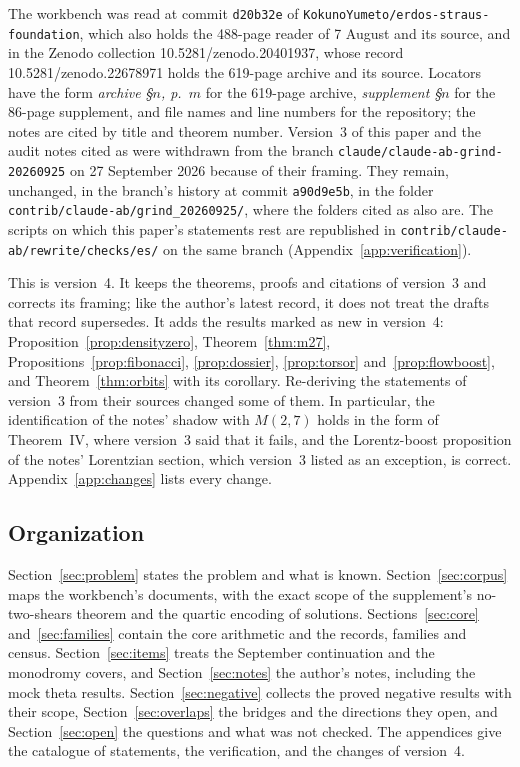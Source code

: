 The workbench was read at commit \texttt{d20b32e} of \texttt{KokunoYumeto/erdos-straus-foundation}, which also holds the 488-page reader of 7 August and its source, and in the Zenodo collection 10.5281/zenodo.20401937, whose record 10.5281/zenodo.22678971 holds the 619-page archive and its source. Locators have the form \emph{archive §$n$, p.~$m$} for the 619-page archive, \emph{supplement §$n$} for the 86-page supplement, and file names and line numbers for the repository; the notes are cited by title and theorem number. Version~3 of this paper and the audit notes cited as  were withdrawn from the branch \texttt{claude/claude-ab-grind-20260925} on 27 September 2026 because of their framing. They remain, unchanged, in the branch's history at commit \texttt{a90d9e5b}, in the folder \texttt{contrib/claude-ab/grind\_20260925/}, where the folders cited as  also are. The scripts on which this paper's statements rest are republished in \texttt{contrib/claude-ab/rewrite/checks/es/} on the same branch (Appendix~\ref{app:verification}).

This is version~4. It keeps the theorems, proofs and citations of version~3 and corrects its framing; like the author's latest record, it does not treat the drafts that record supersedes. It adds the results marked as new in version~4: Proposition~\ref{prop:densityzero}, Theorem~\ref{thm:m27}, Propositions~\ref{prop:fibonacci}, \ref{prop:dossier}, \ref{prop:torsor} and~\ref{prop:flowboost}, and Theorem~\ref{thm:orbits} with its corollary. Re-deriving the statements of version~3 from their sources changed some of them. In particular, the identification of the notes' shadow with $M(2,7)$ holds in the form of Theorem~IV, where version~3 said that it fails, and the Lorentz-boost proposition of the notes' Lorentzian section, which version~3 listed as an exception, is correct. Appendix~\ref{app:changes} lists every change.

\subsection*{Organization}

Section~\ref{sec:problem} states the problem and what is known. Section~\ref{sec:corpus} maps the workbench's documents, with the exact scope of the supplement's no-two-shears theorem and the quartic encoding of solutions. Sections~\ref{sec:core} and~\ref{sec:families} contain the core arithmetic and the records, families and census. Section~\ref{sec:items} treats the September continuation and the monodromy covers, and Section~\ref{sec:notes} the author's notes, including the mock theta results. Section~\ref{sec:negative} collects the proved negative results with their scope, Section~\ref{sec:overlaps} the bridges and the directions they open, and Section~\ref{sec:open} the questions and what was not checked. The appendices give the catalogue of statements, the verification, and the changes of version~4.
